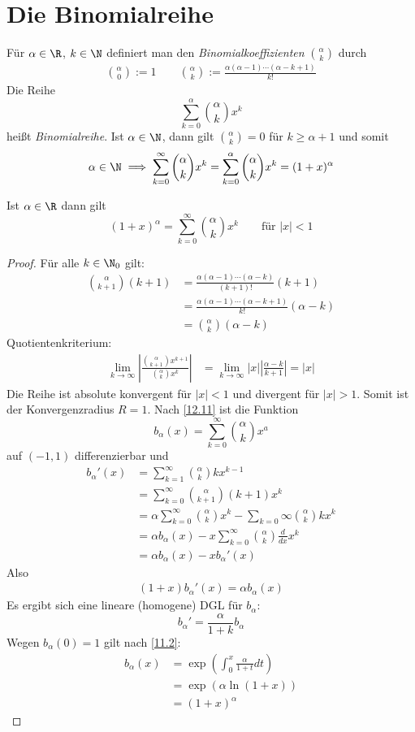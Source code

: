 \documentclass[a4paper,10pt]{scrbook}
\begin{document}
\section{Die Binomialreihe}

Für $\alpha\in\R$, $k\in\N$ definiert man den \emph{Binomialkoeffizienten} $\binom{\alpha}{k}$ durch
\begin{align*}
\binom{\alpha}{0}:= 1 \qquad
\binom{\alpha}{k}:= \frac {\alpha(\alpha-1)\dotsb(\alpha-k+1)}{k!}
\end{align*}
Die Reihe
\[
\sum_{k=0}^\alpha\binom{\alpha}{k}x^k
\]
heißt \emph{Binomialreihe}.
Ist $\alpha\in \N$, dann gilt
$\binom{\alpha}k = 0$ für $k\ge \alpha +1$ und somit
\[
\alpha\in\N \implies \sum_{k=0}^\infty\binom\alpha kx^k=\sum_{k=0}^\alpha\binom \alpha kx^k=(1+x)^\alpha
\]
\setcounter{thm}{14}
\begin{thm}
\label{12.15}
	Ist $\alpha\in\R$ dann gilt
\[
(1+x)^\alpha=\sum_{k=0}^\infty\binom\alpha kx^k \qquad \text{für }|x|<1
\]
\begin{proof}
Für alle $k\in\N_0$ gilt:
\begin{align*}
\binom{\alpha}{k+1}(k+1)&=\frac{\alpha(\alpha-1)\dotsb(\alpha-k)}{(k+1)!}(k+1)\\
&=\frac {\alpha(\alpha-1)\dotsb(\alpha-k+1)}{k!}(\alpha-k)\\
&=\binom{\alpha}k(\alpha-k)
\end{align*}
Quotientenkriterium:
\begin{align*}
\lim_{k\to\infty}\left|\frac{\binom\alpha {k+1}x^{k+1}}{\binom{\alpha}kx^k}\right|&=
\lim_{k\to\infty}|x|\left|\frac{\alpha-k}{k+1}\right|=|x|
\end{align*}
Die Reihe ist absolute konvergent für $|x|<1$ und divergent für $|x|>1$.
Somit ist der Konvergenzradius $R=1$.
Nach \ref{12.11} ist die Funktion
\[
b_\alpha(x)=\sum_{k=0}^\infty\binom\alpha k x^a
\]
auf $(-1,1)$ differenzierbar und
\begin{align*}
b_\alpha'(x)&=\sum_{k=1}^\infty\binom\alpha kkx^{k-1}\\
&=\sum_{k=0}^\infty\binom\alpha{k+1}(k+1)x^k\\
&=\alpha\sum_{k=0}^\infty\binom\alpha kx^k-\sum_{k=0}\infty\binom\alpha kkx^k\\
&= \alpha b_\alpha(x) - x\sum_{k=0}^\infty\binom \alpha k\frac d{dx}x^k\\
&= \alpha b_\alpha(x)-xb_\alpha'(x)
\end{align*}
Also
\begin{align*}
(1+x)b_\alpha'(x)=\alpha b_\alpha(x)
\end{align*}
Es ergibt sich eine lineare (homogene) DGL für $b_\alpha$:
\[
b_\alpha'=\frac \alpha{1+k}b_\alpha
\]
Wegen $b_\alpha(0)=1$ gilt nach \ref{11.2}:
\begin{align*}
b_\alpha(x)&=\exp\left(\int_0^x\frac\alpha{1+t}dt\right)\\
&=\exp(\alpha\ln(1+x))\\
&=(1+x)^\alpha
\end{align*}
\end{proof}


\end{thm}
\end{document}

